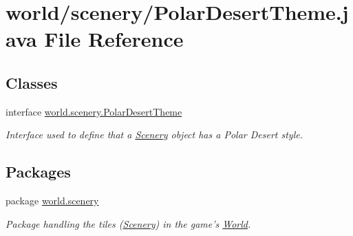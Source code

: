 \hypertarget{a00067}{\section{world/scenery/\-Polar\-Desert\-Theme.java File Reference}
\label{a00067}
}
\subsection*{Classes}
\begin{DoxyCompactItemize}
\item 
interface \hyperlink{a00019}{world.\-scenery.\-Polar\-Desert\-Theme}
\begin{DoxyCompactList}\small\item\em Interface used to define that a \hyperlink{a00024}{Scenery} object has a Polar Desert style. \end{DoxyCompactList}\end{DoxyCompactItemize}
\subsection*{Packages}
\begin{DoxyCompactItemize}
\item 
package \hyperlink{a00091}{world.\-scenery}
\begin{DoxyCompactList}\small\item\em Package handling the tiles (\hyperlink{a00024}{Scenery}) in the game's \hyperlink{a00039}{World}. \end{DoxyCompactList}\end{DoxyCompactItemize}
